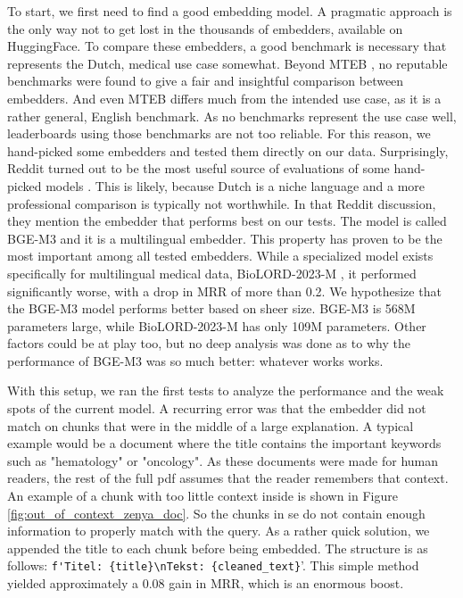 To start, we first need to find a good embedding model. A pragmatic approach is the only way not to get lost in the thousands of embedders, available on HuggingFace. To compare these embedders, a good benchmark is necessary that represents the Dutch, medical use case somewhat. Beyond MTEB \cite{muennighoff2022mteb}, no reputable benchmarks were found to give a fair and insightful comparison between embedders. And even MTEB differs much from the intended use case, as it is a rather general, English benchmark. As no benchmarks represent the use case well, leaderboards using those benchmarks are not too reliable. For this reason, we hand-picked some embedders and tested them directly on our data. Surprisingly, Reddit turned out to be the most useful source of evaluations of some hand-picked models \cite{reddit2025embedding}. This is likely, because Dutch is a niche language and a more professional comparison is typically not worthwhile. In that Reddit discussion, they mention the embedder that performs best on our tests. The model is called BGE-M3 and it is a multilingual embedder. This property has proven to be the most important among all tested embedders. While a specialized model exists specifically for multilingual medical data, BioLORD-2023-M \cite{remy2024biolord}, it performed significantly worse, with a drop in MRR of more than 0.2. We hypothesize that the BGE-M3 model performs better based on sheer size. BGE-M3 is 568M parameters large, while BioLORD-2023-M has only 109M parameters. Other factors could be at play too, but no deep analysis was done as to why the performance of BGE-M3 was so much better: whatever works works.

With this setup, we ran the first tests to analyze the performance and the weak spots of the current model. A recurring error was that the embedder did not match on chunks that were in the middle of a large explanation. A typical example would be a document where the title contains the important keywords such as "hematology" or "oncology". As these documents were made for human readers, the rest of the full pdf assumes that the reader remembers that context. An example of a chunk with too little context inside is shown in Figure \ref{fig:out_of_context_zenya_doc}. So the chunks in se do not contain enough information to properly match with the query. As a rather quick solution, we appended the title to each chunk before being embedded. The structure is as follows: \verb|f'Titel: {title}\nTekst: {cleaned_text}|'. This simple method yielded approximately a 0.08 gain in MRR, which is an enormous boost.

